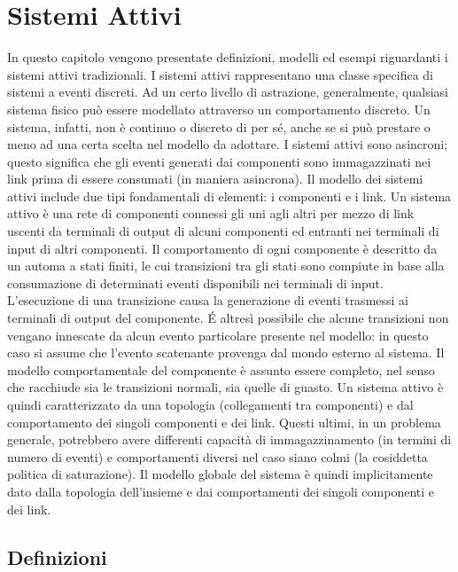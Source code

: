 \chapter{Sistemi Attivi}
In questo capitolo vengono presentate definizioni, modelli ed esempi riguardanti i sistemi attivi tradizionali\cite{book:lamp}.
I sistemi attivi rappresentano una classe specifica di sistemi a eventi discreti\cite{book:DES}. Ad un certo livello di astrazione, generalmente, qualsiasi sistema fisico può essere modellato attraverso un comportamento discreto. Un sistema, infatti, non è continuo o discreto di per sé, anche se si può prestare o meno ad una certa scelta nel modello da adottare.
I sistemi attivi sono asincroni; questo significa che gli eventi generati dai componenti sono immagazzinati nei link prima di essere consumati (in maniera asincrona).
Il modello dei sistemi attivi include due tipi fondamentali di elementi: i componenti e i link. Un sistema attivo è una rete di componenti connessi gli uni agli altri per mezzo di link uscenti da terminali di output di alcuni componenti ed entranti nei terminali di input di altri componenti. Il comportamento di ogni componente è descritto da un automa a stati finiti, le cui transizioni tra gli stati sono compiute in base alla consumazione di determinati eventi disponibili nei terminali di input. L'esecuzione di una transizione causa la generazione di eventi trasmessi ai terminali di output del componente. \'E altresì possibile che alcune transizioni non vengano innescate da alcun evento particolare presente nel modello: in questo caso si assume che l'evento scatenante provenga dal mondo esterno al sistema. Il modello comportamentale del componente è assunto essere completo, nel senso che racchiude sia le transizioni normali, sia quelle di guasto.
Un sistema attivo è quindi caratterizzato da una topologia (collegamenti tra componenti) e dal comportamento dei singoli componenti e dei link. Questi ultimi, in un problema generale, potrebbero avere differenti capacità di immagazzinamento (in termini di numero di eventi) e comportamenti diversi nel caso siano colmi (la cosiddetta politica di saturazione).
Il modello globale del sistema è quindi implicitamente dato dalla topologia dell'insieme e dai comportamenti dei singoli componenti e dei link. 

\newpage
\section{Definizioni}
